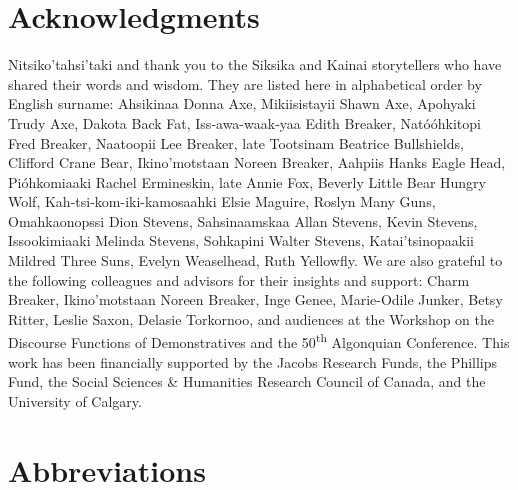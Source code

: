 \documentclass[output=paper,colorlinks,citecolor=brown]{langscibook}
\begin{document}
\section*{Acknowledgments}

Nitsiko’tahsi’taki and thank you to the Siksika and Kainai storytellers who have shared their words and wisdom. They are listed here in alphabetical order by English surname: Ahsikinaa Donna Axe, Mikiisistayii Shawn Axe, Apohyaki Trudy Axe, Dakota Back Fat, Iss-awa-waak-yaa Edith Breaker, Natóóhkitopi Fred Breaker, Naatoopii Lee Breaker, late Tootsinam Beatrice Bullshields, Clifford Crane Bear, Ikino’motstaan Noreen Breaker, Aahpiis Hanks Eagle Head, Pióhkomiaaki Rachel Ermineskin, late Annie Fox, Beverly Little Bear Hungry Wolf, Kah-tsi-kom-iki-kamosaahki Elsie Maguire, Roslyn Many Guns, Omahkaonopssi Dion Stevens, Sahsinaamskaa Allan Stevens, Kevin Stevens, Issookimiaaki Melinda Stevens, Sohkapini Walter Stevens, Katai’tsinopaakii Mildred Three Suns, Evelyn Weaselhead, Ruth Yellowfly. We are also grateful to the following colleagues and advisors for their insights and support: Charm Breaker, Ikino’motstaan Noreen Breaker, Inge Genee, Marie-Odile Junker, Betsy Ritter, Leslie Saxon, Delasie Torkornoo, and audiences at the Workshop on the Discourse Functions of Demonstratives and the 50\textsuperscript{th} Algonquian Conference. This work has been financially supported by the Jacobs Research Funds, the Phillips Fund, the Social Sciences \& Humanities Research Council of Canada, and the University of Calgary.

\section*{Abbreviations}
\end{document}
